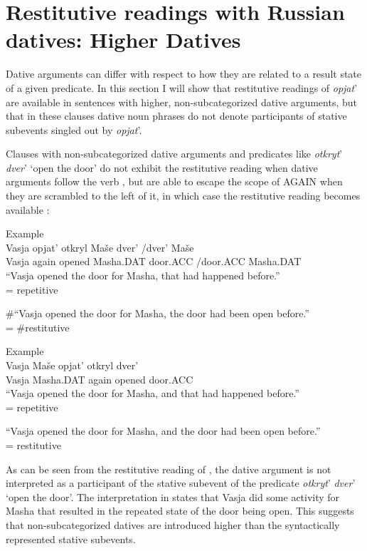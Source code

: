 \documentclass[output=paper,modfonts,nonflat,
 hidelinks
]{langsci/langscibook}
\begin{document}
\section{Restitutive readings with Russian datives: Higher Datives}

Dative arguments can differ with respect to how they are related to a result state of a given predicate. In this section I will show that restitutive readings of \textit{opjat}’ are available in sentences with higher, non-subcategorized dative arguments, but that in these clauses dative noun phrases do not denote participants of stative subevents singled out by \textit{opjat}’.



Clauses with non-subcategorized dative arguments and predicates like \textit{otkryt}’ \textit{dver}’ ‘open the door’ do not exhibit the restitutive reading when dative arguments follow the verb , but are able to escape the scope of AGAIN when they are scrambled to the left of it, in which case the restitutive reading becomes available :


 \ea\label{ex:bondarenko:}
{Example}\\

\gll Vasja opjat’ otkryl Maše dver’ /dver’ Maše\\
     Vasja again opened Masha.DAT door.ACC /door.ACC Masha.DAT\\
\ea “Vasja opened the door for Masha, that had happened before.”\\
= {repetitive}

\ex  \#“Vasja opened the door for Masha, the door had been open   before.”\\
= {\#restitutive}
\z
\z

 \ea\label{ex:bondarenko:}
{Example}\\

\gll Vasja Maše opjat’ otkryl dver’\\
     Vasja Masha.DAT again opened door.ACC\\
\ea “Vasja opened the door for Masha, and that had happened   before.”\\
= {repetitive}

\ex “Vasja opened the door for Masha, and the door had been open   before.”\\
= {restitutive}
\z
\z


As can be seen from the restitutive reading of , the dative argument is not interpreted as a participant of the stative subevent of the predicate \textit{otkryt}’ \textit{dver}’ ‘open the door’. The interpretation in  states that Vasja did some activity for Masha that resulted in the repeated state of the door being open. This suggests that non-subcategorized datives are introduced higher than the syntactically represented stative subevents.
\end{document}
